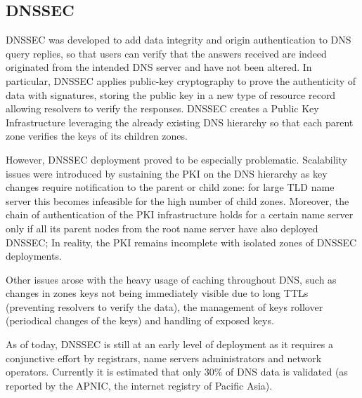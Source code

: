 \documentclass[11pt,a4paper]{article}
\begin{document}
\subsection{DNSSEC}

DNSSEC was developed to add data integrity and origin authentication to DNS query replies, so that users can verify that the answers received are indeed originated from the intended DNS server and have not been altered. In particular, DNSSEC applies public-key cryptography to prove the authenticity of data with signatures, storing the public key in a new type of resource record allowing resolvers to verify the responses. DNSSEC creates a Public Key Infrastructure leveraging the already existing DNS hierarchy so that each parent zone verifies the keys of its children zones.

\hfill \break
\noindent
However, DNSSEC deployment proved to be especially problematic. Scalability issues were introduced by sustaining the PKI on the DNS hierarchy as key changes require notification to the parent or child zone: for large TLD name server this becomes infeasible for the high number of child zones. Moreover, the chain of authentication of the PKI infrastructure holds for a certain name server only if all its parent nodes from the root name server have also deployed DNSSEC; In reality, the PKI remains incomplete with isolated zones of DNSSEC deployments.

\noindent
Other issues arose with the heavy usage of caching throughout DNS, such as changes in zones keys not being immediately visible due to long TTLs (preventing resolvers to verify the data), the management of keys rollover (periodical changes of the keys) and handling of exposed keys.

\hfill \break
\noindent
As of today, DNSSEC is still at an early level of deployment as it requires a conjunctive effort by registrars, name servers administrators and network operators. Currently it is estimated that only 30\% of DNS data is validated (as reported by the APNIC, the internet registry of Pacific Asia).
\end{document}
